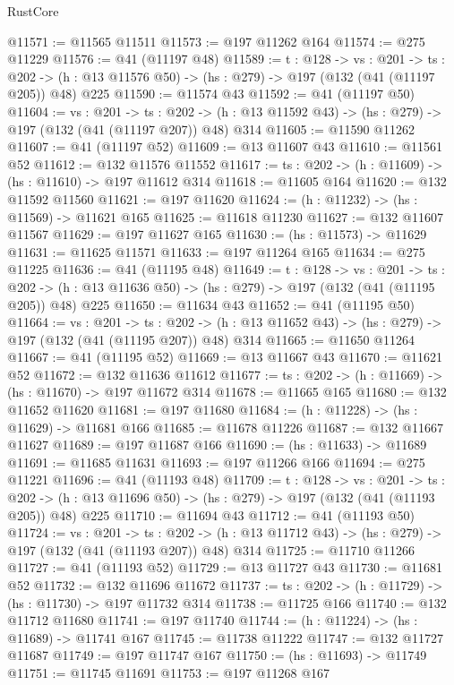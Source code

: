 \begin{lexlean}{RustCore}
\begin{coremodule}
@11571 := @11565 @11511
@11573 := @197 @11262 @164
@11574 := @275 @11229
@11576 := @41 (@11197 @48)
@11589 := {t : @128} ->
  {vs : @201} ->
  {ts : @202} -> (h : @13 @11576 @50) -> (hs : @279) -> @197 (@132 (@41 (@11197 @205)) @48) @225
@11590 := @11574 @43
@11592 := @41 (@11197 @50)
@11604 := {vs : @201} ->
  {ts : @202} -> (h : @13 @11592 @43) -> (hs : @279) -> @197 (@132 (@41 (@11197 @207)) @48) @314
@11605 := @11590 @11262
@11607 := @41 (@11197 @52)
@11609 := @13 @11607 @43
@11610 := @11561 @52
@11612 := @132 @11576 @11552
@11617 := {ts : @202} -> (h : @11609) -> (hs : @11610) -> @197 @11612 @314
@11618 := @11605 @164
@11620 := @132 @11592 @11560
@11621 := @197 @11620
@11624 := (h : @11232) -> (hs : @11569) -> @11621 @165
@11625 := @11618 @11230
@11627 := @132 @11607 @11567
@11629 := @197 @11627 @165
@11630 := (hs : @11573) -> @11629
@11631 := @11625 @11571
@11633 := @197 @11264 @165
@11634 := @275 @11225
@11636 := @41 (@11195 @48)
@11649 := {t : @128} ->
  {vs : @201} ->
  {ts : @202} -> (h : @13 @11636 @50) -> (hs : @279) -> @197 (@132 (@41 (@11195 @205)) @48) @225
@11650 := @11634 @43
@11652 := @41 (@11195 @50)
@11664 := {vs : @201} ->
  {ts : @202} -> (h : @13 @11652 @43) -> (hs : @279) -> @197 (@132 (@41 (@11195 @207)) @48) @314
@11665 := @11650 @11264
@11667 := @41 (@11195 @52)
@11669 := @13 @11667 @43
@11670 := @11621 @52
@11672 := @132 @11636 @11612
@11677 := {ts : @202} -> (h : @11669) -> (hs : @11670) -> @197 @11672 @314
@11678 := @11665 @165
@11680 := @132 @11652 @11620
@11681 := @197 @11680
@11684 := (h : @11228) -> (hs : @11629) -> @11681 @166
@11685 := @11678 @11226
@11687 := @132 @11667 @11627
@11689 := @197 @11687 @166
@11690 := (hs : @11633) -> @11689
@11691 := @11685 @11631
@11693 := @197 @11266 @166
@11694 := @275 @11221
@11696 := @41 (@11193 @48)
@11709 := {t : @128} ->
  {vs : @201} ->
  {ts : @202} -> (h : @13 @11696 @50) -> (hs : @279) -> @197 (@132 (@41 (@11193 @205)) @48) @225
@11710 := @11694 @43
@11712 := @41 (@11193 @50)
@11724 := {vs : @201} ->
  {ts : @202} -> (h : @13 @11712 @43) -> (hs : @279) -> @197 (@132 (@41 (@11193 @207)) @48) @314
@11725 := @11710 @11266
@11727 := @41 (@11193 @52)
@11729 := @13 @11727 @43
@11730 := @11681 @52
@11732 := @132 @11696 @11672
@11737 := {ts : @202} -> (h : @11729) -> (hs : @11730) -> @197 @11732 @314
@11738 := @11725 @166
@11740 := @132 @11712 @11680
@11741 := @197 @11740
@11744 := (h : @11224) -> (hs : @11689) -> @11741 @167
@11745 := @11738 @11222
@11747 := @132 @11727 @11687
@11749 := @197 @11747 @167
@11750 := (hs : @11693) -> @11749
@11751 := @11745 @11691
@11753 := @197 @11268 @167

\end{coremodule}
\end{lexlean}

